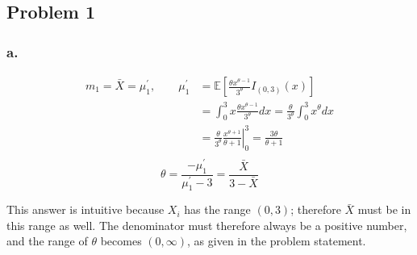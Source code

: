 \documentclass{article}
\begin{document}
\setlength{\headheight}{4\baselineskip}



\subsection*{Problem 1}
\subsubsection*{a.}

\begin{align*}
m_1 = \bar{X} = \mu_1^\prime,\quad\quad \mu_1^\prime &= \mathbb{E}\left[\frac{\theta x^{\theta-1}}{3^{\theta}}I_{(0,3)}(x)\right] \\
&=\int_0^3 x\frac{\theta x^{\theta-1}}{3^{\theta}}dx = \frac{\theta}{3^\theta}\int^3_0x^\theta dx \\
&=\frac{\theta}{3^\theta}\left.\frac{x^{\theta+1}}{\theta+1}\right|^3_0 = \frac{3\theta}{\theta+1} \\
\end{align*}
\[\theta = \frac{-\mu_1^\prime}{\mu_1^\prime-3} = \frac{\bar{X}}{3-\bar{X}}\]

This answer is intuitive because $X_i$ has the range $(0,3)$; therefore $\bar{X}$ must be in this range as well. The denominator must therefore always be a positive number, and the range of $\theta$ becomes $(0,\infty)$, as given in the problem statement.
\end{document}
